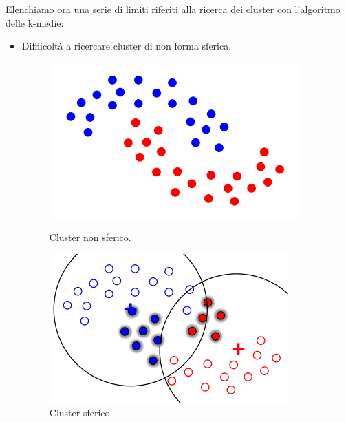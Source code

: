 Elenchiamo ora una serie di limiti riferiti alla ricerca dei cluster con l'algoritmo delle k-medie:
\begin{itemize}
	\item Diffiicoltà  a ricercare cluster di non forma sferica. 
\begin{figure}[H]
	\begin{minipage}[b]{0.30\textwidth}
		\centering
		\includegraphics[width=\textwidth]{clustering/pict/non_sferica_1.png}
		\caption{Cluster non sferico.}
	\end{minipage}
	\hfill
	\begin{minipage}[b]{0.30\textwidth}
		\centering
		\includegraphics[width=\textwidth]{clustering/pict/non_sferica_2.png}
		\caption{Cluster sferico.}
	\end{minipage}
\end{figure}
	

\end{itemize}

